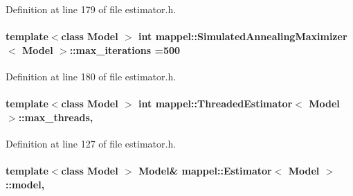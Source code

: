 Definition at line 179 of file estimator.\+h.

\paragraph[{\texorpdfstring{max\+\_\+iterations}{max_iterations}}]{\setlength{\rightskip}{0pt plus 5cm}template$<$class Model $>$ int {\bf mappel\+::\+Simulated\+Annealing\+Maximizer}$<$ Model $>$\+::max\+\_\+iterations =500}\hypertarget{classmappel_1_1SimulatedAnnealingMaximizer_a0b6619e3ed668b51e477037955615f92}{}\label{classmappel_1_1SimulatedAnnealingMaximizer_a0b6619e3ed668b51e477037955615f92}


Definition at line 180 of file estimator.\+h.

\paragraph[{\texorpdfstring{max\+\_\+threads}{max_threads}}]{\setlength{\rightskip}{0pt plus 5cm}template$<$class Model $>$ int {\bf mappel\+::\+Threaded\+Estimator}$<$ Model $>$\+::max\+\_\+threads\hspace{0.3cm}{\ttfamily [protected]}, {\ttfamily [inherited]}}\hypertarget{classmappel_1_1ThreadedEstimator_a31391f8aaab3484f58bfdedbdb22be42}{}\label{classmappel_1_1ThreadedEstimator_a31391f8aaab3484f58bfdedbdb22be42}


Definition at line 127 of file estimator.\+h.

\paragraph[{\texorpdfstring{model}{model}}]{\setlength{\rightskip}{0pt plus 5cm}template$<$class Model $>$ Model\& {\bf mappel\+::\+Estimator}$<$ Model $>$\+::model\hspace{0.3cm}{\ttfamily [protected]}, {\ttfamily [inherited]}}\hypertarget{classmappel_1_1Estimator_a8322546d87ccdf01f8b0dcd9dae509f0}{}\label{classmappel_1_1Estimator_a8322546d87ccdf01f8b0dcd9dae509f0}


